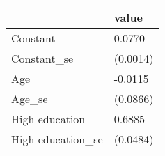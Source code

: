 \begin{tabular}{ll}
\toprule
 & value \\
\midrule
Constant & 0.0770 \\
Constant_se & (0.0014) \\
Age & -0.0115 \\
Age_se & (0.0866) \\
High education & 0.6885 \\
High education_se & (0.0484) \\
\bottomrule
\end{tabular}
